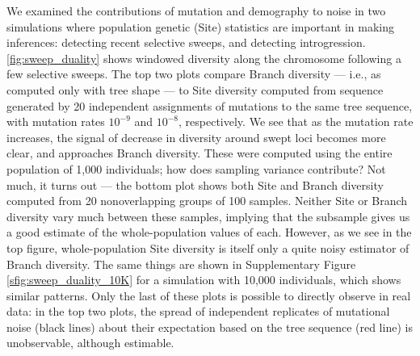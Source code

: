 \documentclass{article}
\begin{document}
We examined the contributions of mutation and demography to noise
in two simulations where population genetic (Site) statistics
are important in making inferences:
detecting recent selective sweeps,
and detecting introgression.
\autoref{fig:sweep_duality} shows windowed
diversity along the chromosome following a few selective sweeps.
The top two plots compare Branch diversity --- i.e., as computed only with tree shape ---
to Site diversity computed from sequence generated by 20 independent assignments of mutations to the same tree sequence,
with mutation rates $10^{-9}$ and $10^{-8}$, respectively.
We see that as the mutation rate increases, the signal of decrease in diversity around swept loci becomes more clear,
and approaches Branch diversity.
These were computed using the entire population of 1,000 individuals;
how does sampling variance contribute?
Not much, it turns out --- the bottom plot shows both Site and Branch diversity
computed from 20 nonoverlapping groups of 100 samples.
Neither Site or Branch diversity vary much between these samples,
implying that the subsample gives us a good estimate of the whole-population values of each.
However, as we see in the top figure,
whole-population Site diversity is itself only a quite noisy estimator of Branch diversity.
The same things are shown in Supplementary Figure \ref{sfig:sweep_duality_10K}
for a simulation with 10,000 individuals, which shows similar patterns.
Only the last of these plots is possible to directly observe in real data:
in the top two plots,
the spread of independent replicates of mutational noise (black lines)
about their expectation based on the tree sequence (red line)
is unobservable, although estimable.
\end{document}
